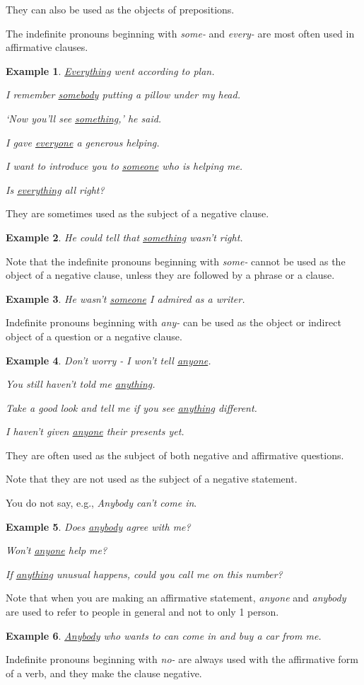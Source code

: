 \documentclass[oneside]{book}
\numberwithin{equation}{section}
\newtheorem{example}{Example}[section]
\begin{document}
They can also be used as the objects of prepositions.

The indefinite pronouns beginning with \textit{some-} and \textit{every-} are most often used in affirmative clauses.
\begin{example}
    \underline{Everything} went according to plan.
    
    I remember \underline{somebody} putting a pillow under my head.
    
    `Now you'll see \underline{something},' he said.
    
    I gave \underline{everyone} a generous helping.
    
    I want to introduce you to \underline{someone} who is helping me.
    
    Is \underline{everything} all right?
\end{example}
They are sometimes used as the subject of a negative clause.
\begin{example}
    He could tell that \underline{something} wasn't right.
\end{example}
Note that the indefinite pronouns beginning with \textit{some-} cannot be used as the object of a negative clause, unless they are followed by a phrase or a clause.
\begin{example}
    He wasn't \underline{someone} I admired as a writer.
\end{example}
%
\noindent{} Indefinite pronouns beginning with \textit{any-} can be used as the object or indirect object of a question or a negative clause.
\begin{example}
    Don't worry - I won't tell \underline{anyone}.
    
    You still haven't told me \underline{anything}.
    
    Take a good look and tell me if you see \underline{anything} different.
    
    I haven't given \underline{anyone} their presents yet.
\end{example}
They are often used as the subject of both negative and affirmative questions.

Note that they are not used as the subject of a negative statement.

You do not say, e.g., \textit{Anybody can't come in}.
\begin{example}
    Does \underline{anybody} agree with me?
    
    Won't \underline{anyone} help me?
    
    If \underline{anything} unusual happens, could you call me on this number?
\end{example}
Note that when you are making an affirmative statement, \textit{anyone} and \textit{anybody} are used to refer to people in general and not to only 1 person.
\begin{example}
    \underline{Anybody} who wants to can come in and buy a car from me.
\end{example}
%
\noindent{} Indefinite pronouns beginning with \textit{no-} are always used with the affirmative form of a verb, and they make the clause negative.
\end{document}
